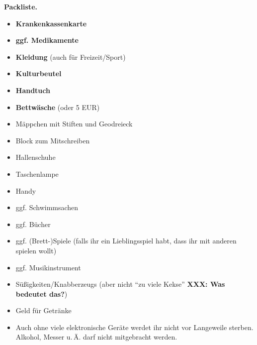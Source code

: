 \documentclass[12pt]{zettel}
\begin{document}
\begin{shaded}
\textbf{Packliste.}

\begin{multicols}{2}
\begin{itemize}
\item \textbf{Krankenkassenkarte}
\item \textbf{ggf. Medikamente}
\item \textbf{Kleidung} (auch für Freizeit/Sport)
\item \textbf{Kulturbeutel}
\item \textbf{Handtuch}
\item \textbf{Bettwäsche} (oder 5 EUR)
\item Mäppchen mit Stiften und Geodreieck
\item Block zum Mitschreiben
\item Hallenschuhe
\item Taschenlampe
\item Handy
\item ggf. Schwimmsachen
\item ggf. Bücher
\item ggf. (Brett-)Spiele (falls ihr ein Lieblingsspiel habt, dass ihr mit anderen
spielen wollt)
\item ggf. Musikinstrument
\item Süßigkeiten/Knabberzeugs (aber nicht "`zu viele Kekse"' \textbf{XXX: Was
bedeutet das?})
\item Geld für Getränke
\item Auch ohne viele elektronische Geräte werdet ihr nicht vor Langeweile
sterben. Alkohol, Messer u.\,Ä. darf nicht mitgebracht werden.
\end{itemize}
\end{multicols}
\end{shaded}
\end{document}
